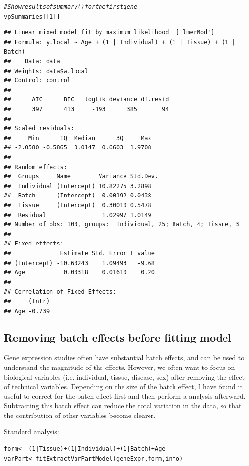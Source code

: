 \documentclass[12pt]{article}\usepackage[]{graphicx}\usepackage[]{xcolor}
\newcommand{\hlnum}[1]{\textcolor[rgb]{0.816,0.125,0.439}{#1}}%
\newcommand{\hlcom}[1]{\textcolor[rgb]{0.502,0.502,0.502}{\textit{#1}}}%
\newcommand{\hlopt}[1]{\textcolor[rgb]{0,0,0}{#1}}%
\newcommand{\hlstd}[1]{\textcolor[rgb]{0.251,0.251,0.251}{#1}}%
\newcommand{\hlkwb}[1]{\textcolor[rgb]{0,0,0}{#1}}%
\newcommand{\hlkwd}[1]{\textcolor[rgb]{0.878,0.439,0.125}{#1}}%
\newenvironment{knitrout}{}{} %
\begin{document}
\begin{knitrout}
\color{fgcolor}\begin{kframe}
\begin{alltt}
\hlcom{# Show results of summary() for the first gene}
\hlstd{vpSummaries[[}\hlnum{1}\hlstd{]]}
\end{alltt}
\begin{verbatim}
## Linear mixed model fit by maximum likelihood  ['lmerMod']
## Formula: y.local ~ Age + (1 | Individual) + (1 | Tissue) + (1 | Batch)
##    Data: data
## Weights: data$w.local
## Control: control
## 
##      AIC      BIC   logLik deviance df.resid 
##      397      413     -193      385       94 
## 
## Scaled residuals: 
##     Min      1Q  Median      3Q     Max 
## -2.0580 -0.5865  0.0147  0.6603  1.9708 
## 
## Random effects:
##  Groups     Name        Variance Std.Dev.
##  Individual (Intercept) 10.82275 3.2898  
##  Batch      (Intercept)  0.00192 0.0438  
##  Tissue     (Intercept)  0.30010 0.5478  
##  Residual                1.02997 1.0149  
## Number of obs: 100, groups:  Individual, 25; Batch, 4; Tissue, 3
## 
## Fixed effects:
##              Estimate Std. Error t value
## (Intercept) -10.60243    1.09493   -9.68
## Age           0.00318    0.01610    0.20
## 
## Correlation of Fixed Effects:
##     (Intr)
## Age -0.739
\end{verbatim}
\end{kframe}
\end{knitrout}


\subsection{Removing batch effects before fitting model}

Gene expression studies often have substantial batch effects, and  can be used to understand the magnitude of the effects.  However, we often want to focus on biological variables (i.e. individual, tissue, disease, sex) after removing the effect of technical variables.  Depending on the size of the batch effect, I have found it useful to correct for the batch effect first and then perform a  analysis afterward.  Subtracting this batch effect can reduce the total variation in the data, so that the contribution of other variables become clearer.  

Standard analysis:
\begin{knitrout}
\color{fgcolor}\begin{kframe}
\begin{alltt}
\hlstd{form} \hlkwb{<-} \hlopt{~} \hlstd{(}\hlnum{1} \hlopt{|} \hlstd{Tissue)} \hlopt{+} \hlstd{(}\hlnum{1} \hlopt{|} \hlstd{Individual)} \hlopt{+} \hlstd{(}\hlnum{1} \hlopt{|} \hlstd{Batch)} \hlopt{+} \hlstd{Age}
\hlstd{varPart} \hlkwb{<-} \hlkwd{fitExtractVarPartModel}\hlstd{(geneExpr, form, info)}
\end{alltt}
\end{kframe}
\end{knitrout}
\end{document}

